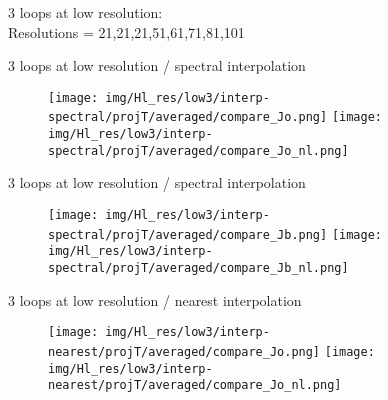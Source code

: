 \documentclass[francais]{beamer}
\begin{document}
\begin{frame}
\begin{center}
3 loops at low resolution:\\
Resolutions = 21,21,21,51,61,71,81,101
\end{center}
\end{frame}

\begin{frame}{3 loops at low resolution / spectral interpolation}
\begin{center}
\begin{figure}
  \texttt{[image: img/Hl\_res/low3/interp-spectral/projT/averaged/compare\_Jo.png]}
\endminipage\hfill
{}
  \texttt{[image: img/Hl\_res/low3/interp-spectral/projT/averaged/compare\_Jo\_nl.png]}
\endminipage
\end{figure}
\end{center}
\end{frame}

\begin{frame}{3 loops at low resolution / spectral interpolation}
\begin{center}
\begin{figure}
  \texttt{[image: img/Hl\_res/low3/interp-spectral/projT/averaged/compare\_Jb.png]}
\endminipage\hfill
{}
  \texttt{[image: img/Hl\_res/low3/interp-spectral/projT/averaged/compare\_Jb\_nl.png]}
\endminipage
\end{figure}
\end{center}
\end{frame}
\begin{frame}{3 loops at low resolution / nearest interpolation}
\begin{center}
\begin{figure}
  \texttt{[image: img/Hl\_res/low3/interp-nearest/projT/averaged/compare\_Jo.png]}
\endminipage\hfill
{}
  \texttt{[image: img/Hl\_res/low3/interp-nearest/projT/averaged/compare\_Jo\_nl.png]}
\endminipage
\end{figure}
\end{center}
\end{frame}
\end{document}
